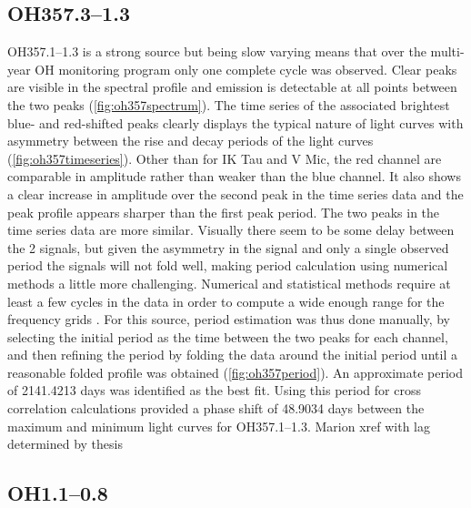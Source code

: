 \subsection*{OH357.3--1.3}
OH357.1–1.3 is a strong source but being slow varying means that over the multi-year OH monitoring program only one complete cycle was observed.
Clear peaks are visible in the spectral profile and emission is detectable  at all points between the two peaks (\cref{fig:oh357spectrum}).
The time series of the associated brightest blue- and red-shifted peaks clearly displays the typical nature of light curves with asymmetry between the rise and decay periods of the light curves (\cref{fig:oh357timeseries}).
Other than for IK Tau and V Mic, the red channel are comparable in amplitude rather than weaker than the blue channel.
It also shows a clear increase in amplitude over the second peak in the time series data and the peak profile appears sharper than the first peak period.
The two peaks in the time series data are more similar.
Visually there seem to be some delay between the 2 signals, but given the asymmetry in the signal and only a single observed period the signals will not fold well, making period calculation using numerical methods a little more challenging.
Numerical and statistical methods require at least a few cycles in the data in order to compute a wide enough range for the frequency grids
\citep{2018ApJS..236...16V}.
For this source, period estimation was thus done manually, by selecting the initial period as the time between the two peaks for each channel, and then refining the period by folding the data around the initial period until a reasonable folded profile was obtained (\cref{fig:oh357period}).
An approximate period of 2141.4213 days was identified as the best fit.
Using this period for cross correlation calculations provided a phase shift of 48.9034 days between the maximum and minimum light curves for OH357.1–1.3.
{\color {red}
Marion xref with lag determined by thesis
}


\subsection*{OH1.1--0.8}
